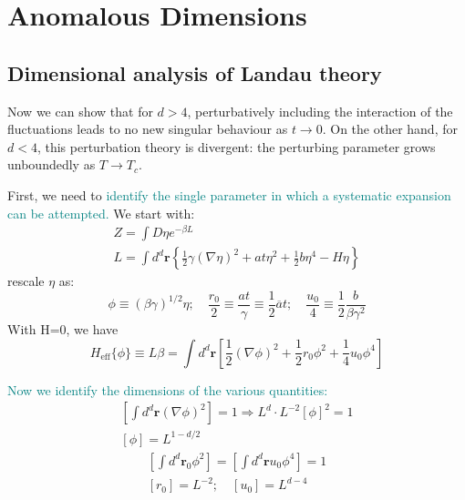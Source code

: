 \documentclass[12pt,titlepage]{article}
\newcommand{\tealp}[1]{\textcolor{teal}{#1}}
\numberwithin{equation}{section}
\begin{document}
\section{Anomalous Dimensions}
\subsection{Dimensional analysis of Landau theory}
Now we can show that for $d>4$, perturbatively including the interaction of the fluctuations leads to no new singular behaviour as $t \rightarrow 0$. On the other hand, for $d<4$, this perturbation theory is divergent: the perturbing parameter grows unboundedly as $T\rightarrow T_c$.

First, we need to \tealp{identify the single parameter in which a systematic expansion can be attempted.} We start with:
\begin{equation}
\begin{array}{c}{Z=\int D \eta e^{-\beta L}} \\ {L=\int d^{d} \mathbf{r}\left\{\frac{1}{2} \gamma(\nabla \eta)^{2}+a t \eta^{2}+\frac{1}{2} b \eta^{4}-H \eta\right\}}\end{array}
\end{equation}
rescale $\eta$ as:
\begin{equation}
\phi \equiv(\beta \gamma)^{1 / 2} \eta ; \quad \frac{r_{0}}{2} \equiv \frac{a t}{\gamma} \equiv \frac{1}{2} \overline{a} t ; \quad \frac{u_{0}}{4} \equiv \frac{1}{2} \frac{b}{\beta \gamma^{2}}
\end{equation}
With H=0, we have
\begin{equation}
H_{\mathrm{eff}}\{\phi\} \equiv L \beta=\int d^{d} \mathbf{r}\left[\frac{1}{2}(\nabla \phi)^{2}+\frac{1}{2} r_{0} \phi^{2}+\frac{1}{4} u_{0} \phi^{4}\right]
\end{equation}

\tealp{Now we identify the dimensions of the various quantities:}
\begin{equation}
\begin{array}{c}{\left[\int d^{d} \mathbf{r}(\nabla \phi)^{2}\right]=1 \Longrightarrow L^{d} \cdot L^{-2}[\phi]^{2}=1} \\ {[\phi]=L^{1-d / 2}}\end{array}
\end{equation}
\begin{equation}
\begin{array}{c}{\left[\int d^{d} \mathbf{r}_{0} \phi^{2}\right]=\left[\int d^{d} \mathbf{r} u_{0} \phi^{4}\right]=1} \\ {\left[r_{0}\right]=L^{-2} ; \quad\left[u_{0}\right]=L^{d-4}}\end{array}
\end{equation}
\end{document}

